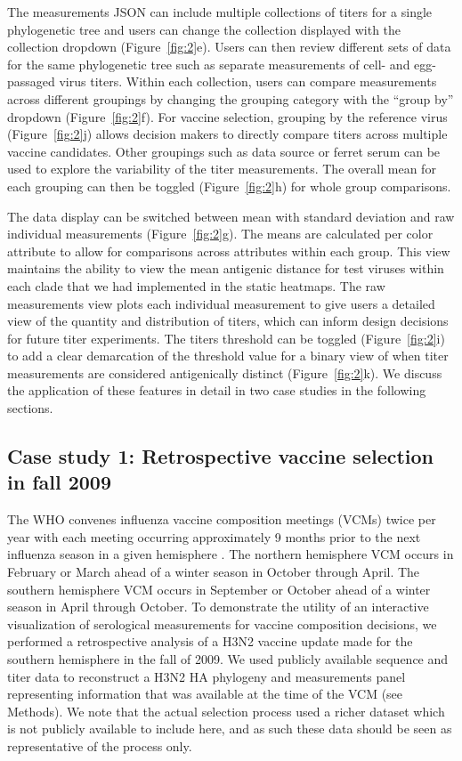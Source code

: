 \documentclass[utf8]{FrontiersinHarvard} %
\begin{document}
The measurements JSON can include multiple collections of titers for a single phylogenetic tree and users can change the collection displayed with the collection dropdown (Figure~\ref{fig:2}e).
Users can then review different sets of data for the same phylogenetic tree such as separate measurements of cell- and egg-passaged virus titers.
Within each collection, users can compare measurements across different groupings by changing the grouping category with the ``group by'' dropdown (Figure~\ref{fig:2}f).
For vaccine selection, grouping by the reference virus (Figure~\ref{fig:2}j) allows decision makers to directly compare titers across multiple vaccine candidates.
Other groupings such as data source or ferret serum can be used to explore the variability of the titer measurements.
The overall mean for each grouping can then be toggled (Figure~\ref{fig:2}h) for whole group comparisons.

The data display can be switched between mean with standard deviation and raw individual measurements (Figure~\ref{fig:2}g).
The means are calculated per color attribute to allow for comparisons across attributes within each group.
This view maintains the ability to view the mean antigenic distance for test viruses within each clade that we had implemented in the static heatmaps.
The raw measurements view plots each individual measurement to give users a detailed view of the quantity and distribution of titers, which can inform design decisions for future titer experiments.
The titers threshold can be toggled (Figure~\ref{fig:2}i) to add a clear demarcation of the threshold value for a binary view of when titer measurements are considered antigenically distinct (Figure~\ref{fig:2}k).
We discuss the application of these features in detail in two case studies in the following sections.

\subsection{Case study 1: Retrospective vaccine selection in fall 2009}

The WHO convenes influenza vaccine composition meetings (VCMs) twice per year with each meeting occurring approximately 9 months prior to the next influenza season in a given hemisphere \citep{Morris:2017ea}.
The northern hemisphere VCM occurs in February or March ahead of a winter season in October through April.
The southern hemisphere VCM occurs in September or October ahead of a winter season in April through October.
To demonstrate the utility of an interactive visualization of serological measurements for vaccine composition decisions, we performed a retrospective analysis of a H3N2 vaccine update made for the southern hemisphere in the fall of 2009.
We used publicly available sequence and titer data \citep{Bedford:2014bf} to reconstruct a H3N2 HA phylogeny and measurements panel representing information that was available at the time of the VCM (see Methods).
We note that the actual selection process used a richer dataset which is not publicly available to include here, and as such these data should be seen as representative of the process only.
\end{document}
